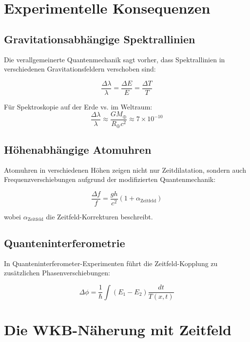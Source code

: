 \documentclass[12pt,a4paper]{report}
\begin{document}
	\section{Experimentelle Konsequenzen}
	
	\subsection{Gravitationsabhängige Spektrallinien}
	
	Die verallgemeinerte Quantenmechanik sagt vorher, dass Spektrallinien in verschiedenen Gravitationsfeldern verschoben sind:
	
	\begin{equation}
		\frac{\Delta\lambda}{\lambda} = \frac{\Delta E}{E} = \frac{\Delta T}{T}
	\end{equation}
	
	Für Spektroskopie auf der Erde vs. im Weltraum:
	\begin{equation}
		\frac{\Delta\lambda}{\lambda} \approx \frac{GM_\oplus}{R_\oplus c^2} \approx 7 \times 10^{-10}
	\end{equation}
	
	\subsection{Höhenabhängige Atomuhren}
	
	Atomuhren in verschiedenen Höhen zeigen nicht nur Zeitdilatation, sondern auch Frequenzverschiebungen aufgrund der modifizierten Quantenmechanik:
	
	\begin{equation}
		\frac{\Delta f}{f} = \frac{gh}{c^2}\left(1 + \alpha_{\text{Zeitfeld}}\right)
	\end{equation}
	
	wobei $\alpha_{\text{Zeitfeld}}$ die Zeitfeld-Korrekturen beschreibt.
	
	\subsection{Quanteninterferometrie}
	
	In Quanteninterferometer-Experimenten führt die Zeitfeld-Kopplung zu zusätzlichen Phasenverschiebungen:
	
	\begin{equation}
		\Delta\phi = \frac{1}{\hbar}\int (E_1 - E_2) \frac{dt}{T(x,t)}
	\end{equation}
	
	\section{Die WKB-Näherung mit Zeitfeld}
	
\end{document}
